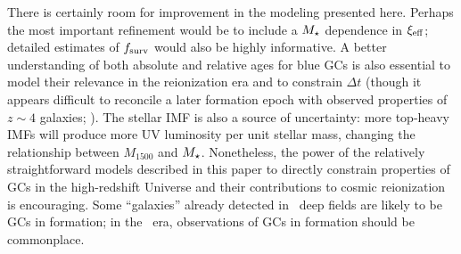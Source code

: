 \documentclass[fleqn,usenatbib]{mnras}
\newcommand{\xieff}{\xi_{\rm eff}}
\newcommand{\fsurv}{f_{\rm surv}}
\begin{document}
{There is certainly room for improvement in the modeling presented here. Perhaps
the most important refinement would be to include a $M_{\star}$ dependence in
$\xieff$; detailed estimates of $\fsurv$ would also be highly informative. A
better understanding of both absolute and relative ages for blue GCs is also
essential to model their relevance in the reionization era and to constrain
$\Delta t$ (though it appears difficult to reconcile a later formation epoch
with observed properties of $z \sim 4$ galaxies; \citealt{katz2013}). The
stellar IMF is also a source of uncertainty: more top-heavy IMFs will produce
more UV luminosity per unit stellar mass, changing the relationship between
$M_{1500}$ and $M_{\star}$. Nonetheless, the power of the relatively
straightforward models described in this paper to directly constrain properties
of GCs in the high-redshift Universe and their contributions to cosmic
reionization is encouraging. Some ``galaxies'' already detected in \hst\ deep
fields are likely to be GCs in formation; in the \jwst\ era, observations of GCs
in formation should be commonplace.

}
\end{document}
